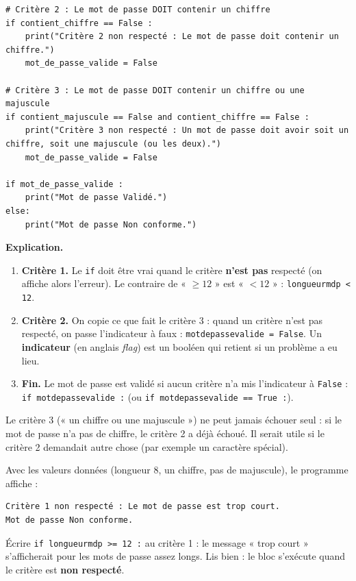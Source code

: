 \documentclass[addpoints, 11pt]{exam}
\newcommand{\explication}{\par\smallskip\noindent\textbf{Explication.}\ }
\newcommand{\code}[1]{\texttt{#1}}
\DeclareRobustCommand{\_}{\textunderscore\allowbreak}
\begin{document}
\begin{questions}
\begin{reponse}
\begin{lstlisting}
# Critère 2 : Le mot de passe DOIT contenir un chiffre
if contient_chiffre == False :
    print("Critère 2 non respecté : Le mot de passe doit contenir un chiffre.")
    mot_de_passe_valide = False

# Critère 3 : Le mot de passe DOIT contenir un chiffre ou une majuscule
if contient_majuscule == False and contient_chiffre == False :
    print("Critère 3 non respecté : Un mot de passe doit avoir soit un chiffre, soit une majuscule (ou les deux).")
    mot_de_passe_valide = False

if mot_de_passe_valide :
    print("Mot de passe Validé.")
else:
    print("Mot de passe Non conforme.")
\end{lstlisting}
\end{reponse}
\explication
\begin{enumerate}
  \item \textbf{Critère 1.} Le \code{if} doit être vrai quand le critère \textbf{n'est pas} respecté (on affiche alors l'erreur). Le contraire de « $\ge 12$ » est « $< 12$ » : \code{longueur\_mdp < 12}.
  \item \textbf{Critère 2.} On copie ce que fait le critère 3 : quand un critère n'est pas respecté, on passe l'indicateur à faux : \code{mot\_de\_passe\_valide = False}. Un \textbf{indicateur} (en anglais \textit{flag}) est un booléen qui retient si un problème a eu lieu.
  \item \textbf{Fin.} Le mot de passe est validé si aucun critère n'a mis l'indicateur à \code{False} : \code{if mot\_de\_passe\_valide :} (ou \code{if mot\_de\_passe\_valide == True :}).
\end{enumerate}
\begin{remarque}
Le critère 3 (« un chiffre ou une majuscule ») ne peut jamais échouer seul : si le mot de passe n'a pas de chiffre, le critère 2 a déjà échoué. Il serait utile si le critère 2 demandait autre chose (par exemple un caractère spécial).
\end{remarque}
Avec les valeurs données (longueur 8, un chiffre, pas de majuscule), le programme affiche :
\begin{lstlisting}[style=sortie]
Critère 1 non respecté : Le mot de passe est trop court.
Mot de passe Non conforme.
\end{lstlisting}

\begin{erreur}
Écrire \code{if longueur\_mdp >= 12 :} au critère 1 : le message « trop court » s'afficherait pour les mots de passe assez longs. Lis bien : le bloc s'exécute quand le critère est \textbf{non respecté}.
\end{erreur}


\end{questions}
\end{document}
